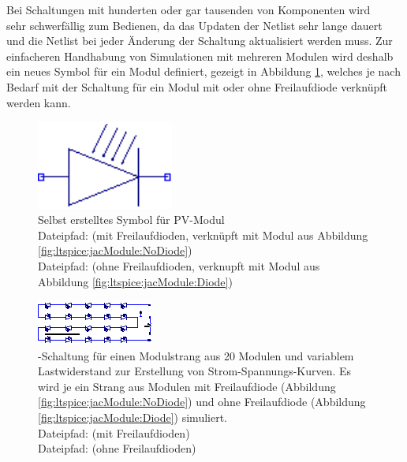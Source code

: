 \clearpage
Bei  \hfill Schaltungen  mit \hfill  hunderten oder  gar tausenden  \hfill von
Komponenten  wird\\   sehr schwerf\"allig  zum Bedienen,  da das
Updaten der  Netlist sehr lange  dauert und  die Netlist bei  jeder \"Anderung
der  Schaltung  aktualisiert  werden  muss.  Zur  einfacheren  Handhabung  von
Simulationen  mit mehreren  Modulen wird  deshalb ein  neues Symbol  f\"ur ein
Modul definiert, gezeigt in Abbildung \ref{fig:ltspice:module:symbol}, welches
je nach Bedarf  mit der Schaltung f\"ur ein Modul  mit oder ohne Freilaufdiode
verkn\"upft werden kann.

\begin{figure}[h!tb]
    \centering
    \includegraphics[width=0.4\textwidth]{images/ltspice/module-symbol.eps}
    \caption{%
        Selbst erstelltes Symbol f\"ur PV-Modul\protect\\
        Dateipfad:      (mit   Freilaufdioden,
        verkn\"upft          mit          Modul         aus          Abbildung
        \ref{fig:ltspice:jacModule:NoDiode})\protect\\
        Dateipfad:  (ohne Freilaufdioden, verknupft mit
        Modul aus Abbildung \ref{fig:ltspice:jacModule:Diode})%
    }
    \label{fig:ltspice:module:symbol}
\end{figure}

\begin{figure}[h!tb]
    \centering
    \includegraphics[width=\textwidth]{images/ltspice/jac/stringNoD.eps}
    \caption[-Schaltung f\"ur Modulstrang]{%
        -Schaltung  f\"ur  einen   Modulstrang  aus  20  Modulen
        und   variablem  Lastwiderstand      zur  Erstellung   von
        Strom-Spannungs-Kurven. Es  wird   je  ein  Strang  aus   Modulen  mit
        Freilaufdiode   (Abbildung  \ref{fig:ltspice:jacModule:NoDiode})   und
        ohne   Freilaufdiode   (Abbildung   \ref{fig:ltspice:jacModule:Diode})
        simuliert.\protect\\
        Dateipfad:  (mit Freilaufdioden)\protect\\
        Dateipfad:  (ohne Freilaufdioden)%
    }
    \label{fig:ltspice:string:ivCurve}
\end{figure}

